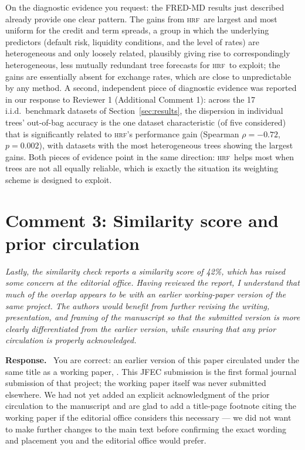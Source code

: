 \documentclass[12pt]{article}
\newcommand{\comment}[1]{\begin{refbox}\itshape #1\end{refbox}}
\newcommand{\response}{\medskip\noindent\textbf{Response.}\ }
\newcommand{\hrf}{\textsc{hrf}}
\begin{document}
On the diagnostic evidence you request: the FRED-MD results just described
already provide one clear pattern. The gains from \hrf\ are largest and
most uniform for the credit and term spreads, a group in which the
underlying predictors (default risk, liquidity conditions, and the level of
rates) are heterogeneous and only loosely related, plausibly giving rise to
correspondingly heterogeneous, less mutually redundant tree forecasts for
\hrf\ to exploit; the gains are essentially absent for exchange rates, which
are close to unpredictable by any method. A second, independent piece of
diagnostic evidence was reported in our response to Reviewer 1 (Additional
Comment 1): across the 17 i.i.d.\ benchmark datasets of
Section~\ref{sec:results}, the dispersion in individual trees' out-of-bag
accuracy is the one dataset characteristic (of five considered) that is
significantly related to \hrf's performance gain (Spearman $\rho = -0.72$,
$p = 0.002$), with datasets with the most heterogeneous trees showing the
largest gains. Both pieces of evidence point in the same direction: \hrf\
helps most when trees are not all equally reliable, which is exactly the
situation its weighting scheme is designed to exploit.

\section*{Comment 3: Similarity score and prior circulation}

\comment{Lastly, the similarity check reports a similarity score of 42\%,
which has raised some concern at the editorial office. Having reviewed the
report, I understand that much of the overlap appears to be with an earlier
working-paper version of the same project. The authors would benefit from
further revising the writing, presentation, and framing of the manuscript
so that the submitted version is more clearly differentiated from the
earlier version, while ensuring that any prior circulation is properly
acknowledged.}

\response
You are correct: an earlier version of this paper circulated under the same
title as a working paper, \citet{beck:kozbur:wolf:2024}. This JFEC
submission is the first formal journal submission of that project; the
working paper itself was never submitted elsewhere. We had not yet added an
explicit acknowledgment of the prior circulation to the manuscript and are
glad to add a title-page footnote citing the working paper if the editorial
office considers this necessary --- we did not want to make further changes
to the main text before confirming the exact wording and placement you and
the editorial office would prefer.
\end{document}
